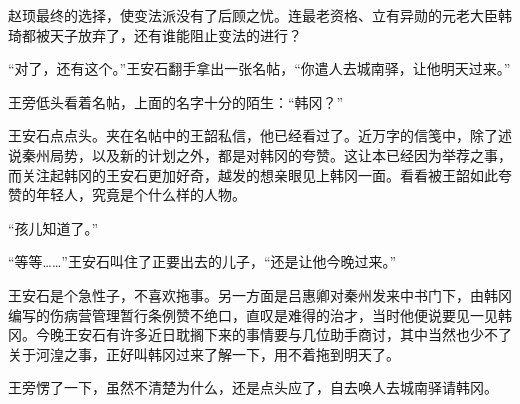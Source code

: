 赵顼最终的选择，使变法派没有了后顾之忧。连最老资格、立有异勋的元老大臣韩琦都被天子放弃了，还有谁能阻止变法的进行？

“对了，还有这个。”王安石翻手拿出一张名帖，“你遣人去城南驿，让他明天过来。”

王旁低头看着名帖，上面的名字十分的陌生：“韩冈？”

王安石点点头。夹在名帖中的王韶私信，他已经看过了。近万字的信笺中，除了述说秦州局势，以及新的计划之外，都是对韩冈的夸赞。这让本已经因为举荐之事，而关注起韩冈的王安石更加好奇，越发的想亲眼见上韩冈一面。看看被王韶如此夸赞的年轻人，究竟是个什么样的人物。

“孩儿知道了。”

“等等……”王安石叫住了正要出去的儿子，“还是让他今晚过来。”

王安石是个急性子，不喜欢拖事。另一方面是吕惠卿对秦州发来中书门下，由韩冈编写的伤病营管理暂行条例赞不绝口，直叹是难得的治才，当时他便说要见一见韩冈。今晚王安石有许多近日耽搁下来的事情要与几位助手商讨，其中当然也少不了关于河湟之事，正好叫韩冈过来了解一下，用不着拖到明天了。

王旁愣了一下，虽然不清楚为什么，还是点头应了，自去唤人去城南驿请韩冈。

